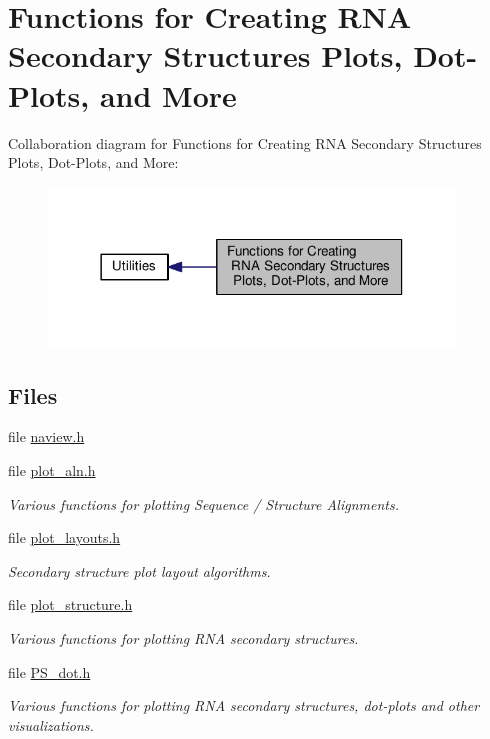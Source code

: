 \hypertarget{group__plotting__utils}{\section{Functions for Creating R\-N\-A Secondary Structures Plots, Dot-\/\-Plots, and More}
\label{group__plotting__utils}
}
Collaboration diagram for Functions for Creating R\-N\-A Secondary Structures Plots, Dot-\/\-Plots, and More\-:
\nopagebreak
\begin{figure}[H]
\begin{center}
\leavevmode
\includegraphics[width=306pt]{group__plotting__utils}
\end{center}
\end{figure}
\subsection*{Files}
\begin{DoxyCompactItemize}
\item 
file \hyperlink{naview_8h}{naview.\-h}
\item 
file \hyperlink{plot__aln_8h}{plot\-\_\-aln.\-h}
\begin{DoxyCompactList}\small\item\em Various functions for plotting Sequence / Structure Alignments. \end{DoxyCompactList}\item 
file \hyperlink{plot__layouts_8h}{plot\-\_\-layouts.\-h}
\begin{DoxyCompactList}\small\item\em Secondary structure plot layout algorithms. \end{DoxyCompactList}\item 
file \hyperlink{plot__structure_8h}{plot\-\_\-structure.\-h}
\begin{DoxyCompactList}\small\item\em Various functions for plotting R\-N\-A secondary structures. \end{DoxyCompactList}\item 
file \hyperlink{PS__dot_8h}{P\-S\-\_\-dot.\-h}
\begin{DoxyCompactList}\small\item\em Various functions for plotting R\-N\-A secondary structures, dot-\/plots and other visualizations. \end{DoxyCompactList}\end{DoxyCompactItemize}
